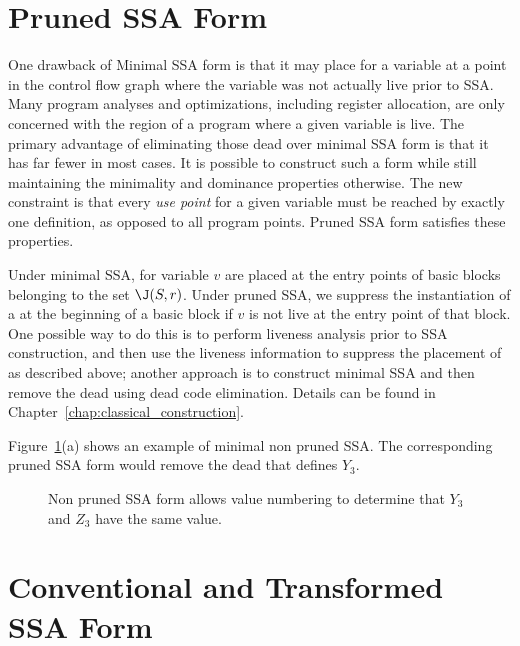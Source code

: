 \section{Pruned SSA Form}
\label{sec-prop-pruned}

One drawback of Minimal SSA form is that it may place \phifuns
for a variable at a point in the control flow graph where the variable was
not actually live prior to SSA. Many program analyses and optimizations,
including register allocation, are only concerned with the region of a 
program where a given variable is live. 
The primary advantage of eliminating those dead \phifuns over minimal SSA form
is that it has far fewer \phifuns in most cases.  
It is possible to construct such a form while still maintaining the minimality
and dominance properties otherwise. The new constraint is that every
\emph{use point} for a given variable must be reached by exactly one
definition, as opposed to all program points. Pruned SSA form satisfies these properties. 

Under minimal SSA, \phifuns for variable $v$ are placed at
the entry points of basic blocks belonging to the set $\J(S,r)$. 
Under pruned SSA, we suppress the instantiation of a \phifun
at the beginning of a basic block if $v$ is not live
at the entry point of that block. One possible way to do this is to
perform liveness analysis prior to SSA construction, and then
use the liveness information to suppress the placement of \phifuns
as described above; another approach is to construct minimal SSA
and then remove the dead \phifuns using dead code
elimination. Details can be found in Chapter~\ref{chap:classical_construction}.

Figure~\ref{fig:properties_and_flavors:pruned}(a) shows an example of minimal non pruned SSA.
The corresponding pruned SSA form would remove the dead \phifun that defines $Y_3$.

\begin{figure}
\begin{center}
\caption{Non pruned SSA form allows value numbering to determine that $Y_3$ and $Z_3$ have the same value.}
\label{fig:properties_and_flavors:pruned}
\end{center}
\end{figure}




\section{Conventional and Transformed SSA Form}
\label{sec-prop-conventional}

